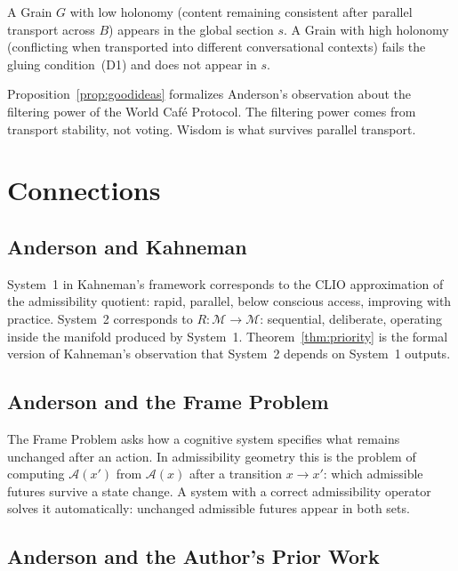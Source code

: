 \documentclass[12pt, a4paper, oneside]{book}
\newcommand{\Adm}{\mathcal{A}}
\newcommand{\M}{\mathcal{M}}
\begin{document}
\begin{proposition}
\label{prop:goodideas}
A Grain $G$ with low holonomy (content remaining consistent after
parallel transport across $B$) appears in the global section $s$.
A Grain with high holonomy (conflicting when transported into different
conversational contexts) fails the gluing condition~(D1) and does not
appear in $s$.
\end{proposition}

\begin{remark}
Proposition~\ref{prop:goodideas} formalizes Anderson's observation about
the filtering power of the World Caf\'{e} Protocol. The filtering power
comes from transport stability, not voting. Wisdom is what survives
parallel transport.
\end{remark}

\chapter{Connections}
\label{ch:connections}

\section{Anderson and Kahneman}

System~1 in Kahneman's framework corresponds to the CLIO approximation
of the admissibility quotient: rapid, parallel, below conscious access,
improving with practice. System~2 corresponds to $R : \M \to \M$:
sequential, deliberate, operating inside the manifold produced by
System~1. Theorem~\ref{thm:priority} is the formal version of
Kahneman's observation that System~2 depends on System~1 outputs.

\section{Anderson and the Frame Problem}

The Frame Problem asks how a cognitive system specifies what remains
unchanged after an action. In admissibility geometry this is the problem
of computing $\Adm(x')$ from $\Adm(x)$ after a transition $x \to x'$:
which admissible futures survive a state change. A system with a correct
admissibility operator solves it automatically: unchanged admissible
futures appear in both sets.

\section{Anderson and the Author's Prior Work}
\end{document}
